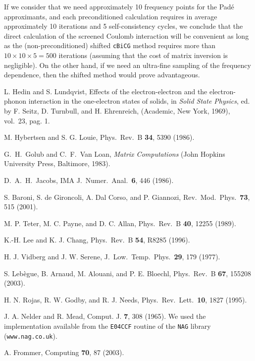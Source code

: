 \documentclass[twocolumn,prb,showpacs,superscriptaddress]{revtex4}
\begin{document}
If we consider that we need approximately 10 frequency points for the
Pad\'e approximants, and each preconditioned calculation requires
in average approximately 10 iterations and 5 self-consistency cycles, 
we conclude that the direct calculation of the screened Coulomb interaction
will be convenient as long as the (non-preconditioned)
shifted {\tt cBiCG} method requires more than $10\times10\times5=500$ 
iterations (assuming that the cost of matrix inversion is negligible).
On the other hand, if we need an ultra-fine sampling of the frequency
dependence, then the shifted method would prove advantageous.

\begin{thebibliography}{99}

L. Hedin and S. Lundqvist,
Effects of the electron-electron and the electron-phonon interaction in
the one-electron states of solids,
in {\it Solid State Physics}, ed. by F. Seitz, D. Turnbull, and
H. Ehrenreich, (Academic, New York, 1969), vol.\ 23, pag. 1.

M. Hybertsen and S. G. Louie, 
Phys.\ Rev.\ B {\bf 34}, 5390 (1986).

G.\ H.\ Golub and C.\ F.\ Van Loan, {\it Matrix Computations} (John Hopkins University Press, Baltimore, 1983).

D.\ A.\ H.\ Jacobs,
IMA J.\ Numer.\ Anal.\ {\bf 6}, 446 (1986).

S. Baroni, S. de Gironcoli, A. Dal Corso, and P. Giannozi, 
Rev.\ Mod.\ Phys.\ {\bf 73}, 515 (2001).

M. P. Teter, M. C. Payne, and D. C. Allan,
Phys.\ Rev.\ B {\bf 40}, 12255 (1989).

K.-H. Lee and K. J. Chang,
Phys.\ Rev.\ B {\bf 54}, R8285 (1996).

H. J. Vidberg and J. W. Serene,
J.\ Low.\ Temp.\ Phys.\ {\bf 29}, 179 (1977).

S. Leb\`egue, B. Arnaud, M. Alouani, and P. E. Bloechl,
Phys.\ Rev.\ B {\bf 67}, 155208 (2003).

H. N. Rojas, R. W. Godby, and R. J. Needs,
Phys.\ Rev.\ Lett.\ {\bf 10}, 1827 (1995).

J. A. Nelder and R. Mead, 
Comput. J. {\bf 7}, 308 (1965).
We used the implementation available from the
{\tt E04CCF} routine of the {\tt NAG} library
({\tt www.nag.co.uk}).

A. Frommer,
Computing {\bf 70}, 87 (2003).


\end{thebibliography}
\end{document}

